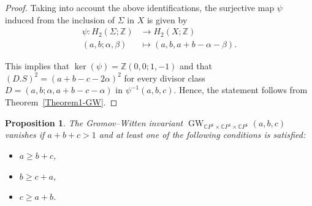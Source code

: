\documentclass[11pt]{amsart}
\numberwithin{equation}{section}
\theoremstyle{definition}
\theoremstyle{plain}
\newtheorem{proposition}[definition]{Proposition}
\theoremstyle{remark}
\newcommand{\Z}{\mathbb{Z}}
\newcommand{\ppp}{\mathbb{C}P^1\times \mathbb{C}P^1\times \mathbb{C}P^1}
\DeclareMathOperator{\GW}{GW}
\begin{document}
 \begin{proof}
 Taking into account the above identifications, the surjective map $\psi$ induced from the inclusion of $\Sigma$ in $X$ is given by
    \begin{align*}
        \psi\colon H_2(\Sigma;\mathbb{Z})&\longrightarrow H_2(X;\mathbb{Z})\\
       (a,b;\alpha,\beta)&\longmapsto (a,b,a+b-\alpha-\beta).
    \end{align*}


    
    This implies that    $\ker(\psi)=\Z(0,0;1,-1)$ and  that $(D.S)^2=(a+b-c-2 \alpha)^2$ for every divisor class $D=(a,b;\alpha,a+b-c-\alpha)$ in $\psi^{-1}(a,b,c)$.    Hence, the statement follows from Theorem~\ref{Theorem1-GW}.
\end{proof}


\begin{proposition} \label{Prop-vanishing.GW}
The Gromov--Witten invariant $ \GW_{\ppp}(a,b,c)$ vanishes if $a+b+c>1$ and at least one of the following conditions is satisfied:
    \begin{itemize}
        \item $a\geq b+c$,
        \item $b\geq c+a$,
        \item $c\geq a+b$.
    \end{itemize}
\end{proposition}
\end{document}
